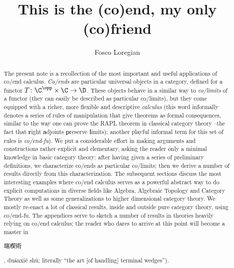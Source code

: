 \title[Ends]{This is the (co)end, my only (co)friend}
 
\author{Fosco Loregian}
\address{%
Department of Mathematics and Statistics             \newline
Masaryk University, Faculty of Sciences              \newline
Kotl\'{a}\v{r}sk\'{a} 2, 611 37 Brno, Czech Republic \newline
\href{mailto:loregianf@math.muni.cz}
   {\sf loregianf@math.muni.cz}
\href{mailto:loregianf@math.muni.cz}
   {\sf fosco.loregian@gmail.com}}

\begin{abstract}
The present note is a recollection of the most important and useful applications of co/end calculus. 
\emph{Co/ends} are particular universal objects in a category, defined for a functor $T\colon 
\C^\opp\times \C \to \D$. These objects behave in a similar way to \emph{co/limits} of a functor 
(they can easily be described as particular co/limits), but they come equipped with a richer, more 
flexible and descriptive \emph{calculus} (this word informally denotes a series of rules of manipulation 
that give theorems as formal consequences, similar to the way one can prove the RAPL theorem in 
classical category theory --the fact that \textbf{r}ight \textbf{a}djoints \textbf{p}reserve 
\textbf{l}imits); another playful informal term for this set of rules is \emph{co/end-fu}). We put a 
considerable effort in making arguments and constructions rather explicit and elementary, asking 
the reader only a minimal knowledge in basic category theory: after having given a series of 
preliminary definitions, we characterize co/ends as particular co/limits; then we derive a number 
of results directly from this characterization. The subsequent sections discuss the most interesting 
examples where co/end calculus serves as a powerful abstract way to do explicit computations in diverse 
fields like Algebra, Algebraic Topology and Category Theory as well as some generalizations to higher 
dimensional category theory. We mostly re\hyp{}enact a lot of classical results, inside and outside 
pure category theory, using co/end-fu. The appendices serve to sketch a number of results in 
theories heavily relying on co/end calculus; the reader who dares to arrive at this point will 
become a master in \begin{CJK*}{UTF8}{bsmi}端楔術\end{CJK*}, du\={a}nxi\={e} shù; literally 
``the art [of handling] terminal wedges'').
\end{abstract}

